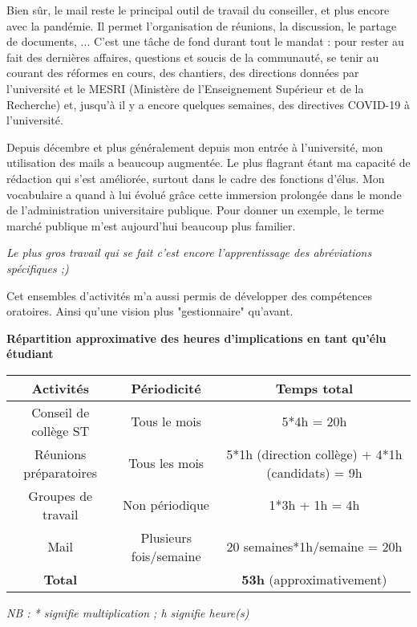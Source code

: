 \documentclass{article}
\begin{document}
Bien sûr, le mail reste le principal outil de travail du conseiller, et plus encore avec la pandémie. Il permet l'organisation de réunions, la discussion, le partage de documents, ... C'est une tâche de fond durant tout le mandat : pour rester au fait des dernières affaires, questions et soucis de la communauté, se tenir au courant des réformes en cours, des chantiers, des directions données par l'université et le MESRI (Ministère de l'Enseignement Supérieur et de la Recherche) et, jusqu'à il y a encore quelques semaines, des directives COVID-19 à l'université.

Depuis décembre et plus généralement depuis mon entrée à l'université, mon utilisation des mails a beaucoup augmentée. Le plus flagrant étant ma capacité de rédaction qui s'est améliorée, surtout dans le cadre des fonctions d'élus. Mon vocabulaire a quand à lui évolué grâce cette immersion prolongée dans le monde de l'administration universitaire publique. Pour donner un exemple, le terme marché publique m'est aujourd'hui beaucoup plus familier. 

\textit{Le plus gros travail qui se fait c'est encore l'apprentissage des abréviations spécifiques ;)}

Cet ensembles d'activités m'a aussi permis de développer des compétences oratoires. Ainsi qu'une vision plus "gestionnaire" qu'avant. 

\begin{center}
\textbf{Répartition approximative des heures d'implications en tant qu'élu étudiant}
\vspace*{10pt}

\begin{tabular}{|c|c|c|}
\hline 
Activités & Périodicité & Temps total\\ 
\hline 
Conseil de collège ST & Tous le mois & 5*4h = 20h \\ 
\hline 
Réunions préparatoires & Tous les mois & 5*1h (direction collège) + 4*1h (candidats) = 9h\\ 
\hline 
Groupes de travail & Non périodique & 1*3h + 1h = 4h\\ 
\hline 
Mail & Plusieurs fois/semaine & 20 semaines*1h/semaine = 20h\\ 
\hline 
\textbf{Total} &  & \textbf{53h} (approximativement) \\ 
\hline 
\end{tabular} 
\end{center}
\textit{NB : * signifie multiplication ; h signifie heure(s)}
\end{document}
